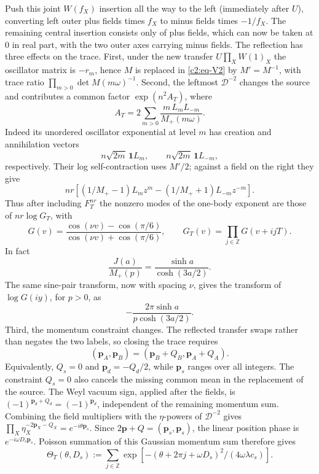 Push this joint \(W(f_X)\) insertion all the way to the left (immediately after \(U\)), converting left outer plus fields times \(f_X\) to minus fields times \(-1/f_X\). The remaining central insertion consists only of plus fields, which can now be taken at 0 in real part, with the two outer axes carrying minus fields. The reflection has three effects on the trace. First, under the new
transfer \(U\prod_X W(1)_X\) the oscillator matrix is \(-r_m\), hence \(M\) is replaced in \eqref{c2:eq-V2} by \(M'=M^{-1}\), with trace ratio \(\prod_{m>0}\det M(m\omega)^{-1}\). Second, the leftmost \(\mathcal D^{-2}\) changes the source and
contributes a common factor \(\exp(n^2 A_T)\), where
\begin{equation}
 A_T=2\sum_{m>0}\frac{m\,L_m L_{-m}}{M_+(m\omega)}.                 \label{c2:eq-V3}
\end{equation}
Indeed its unordered oscillator exponential at level \(m\) has creation and annihilation vectors
\[
 n\sqrt{2m}\,\mathbf 1 L_m,\qquad n\sqrt{2m}\,\mathbf 1 L_{-m},
\]
respectively. Their log self-contraction uses \(M'/2\); against a field on the right they give
\[
 nr[(1/M_+-1)L_m z^m-(1/M_++1)L_{-m}z^{-m}].
\] Thus after including \(F_T^{nr}\) the nonzero modes of the one-body exponent are those of \(nr\log G_T\), with
\[
 G(v)=\frac{\cos(\nu v)-\cos(\pi/6)}{\cos(\nu v)+\cos(\pi/6)},\qquad
 G_T(v)=\prod_{j\in\mathbb Z}G(v+ijT).
\]
In fact
\[
 \frac{J(a)}{M_+(p)}=\frac{\sinh a}{\cosh(3a/2)}.
\]
The same sine-pair transform, now with spacing \(\nu\), gives the transform of \(\log G(iy)\), for \(p>0\), as
\[
 -\frac{2\pi\sinh a}{p\cosh(3a/2)}.
\] Third, the momentum constraint changes. The reflected transfer swaps
rather than negates the two labels, so closing the trace requires
\[
 (\mathbf p_A,\mathbf p_B)
 =(\mathbf p_B+Q_B,\mathbf p_A+Q_A).
\]
Equivalently, \(Q_s=0\) and \(\mathbf p_d=-Q_d/2\), while
\(\mathbf p_s\) ranges over all integers. The constraint \(Q_s=0\)
also cancels the missing common mean in the replacement of the source.
The Weyl vacuum sign, applied after the fields, is
\((-1)^{\mathbf p_d+Q_d}=(-1)^{\mathbf p_d}\), independent of the
remaining momentum sum. Combining the field multipliers with the
\(\eta\)-powers of \(\mathcal D^{-2}\) gives
\(\prod_X\eta_X^{-2\mathbf p_X-Q_X}=e^{-i\theta\mathbf p_s}\).
Since \(2\mathbf p+Q=(\mathbf p_s,\mathbf p_s)\), the linear position
phase is \(e^{-i\omega D_s\mathbf p_s}\). Poisson summation of this
Gaussian momentum sum therefore gives
\begin{equation}
 \Theta_T(\theta,D_s):=
 \sum_{j\in\mathbb Z}
 \exp[-(\theta+2\pi j+\omega D_s)^2/(4\omega\lambda c_s)].
 \label{c2:eq-V4}
\end{equation}

